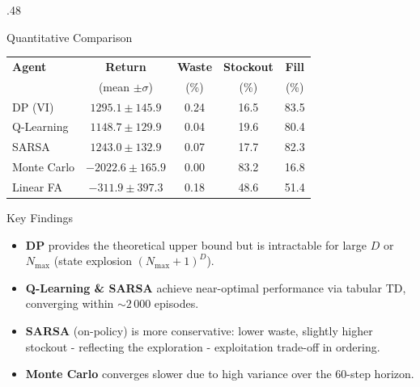 \documentclass[final]{beamer}
\begin{document}
\begin{frame}[t]{}
\begin{columns}[T]
\begin{column}{.48\textwidth}
\begin{exampleblock}{Quantitative Comparison}
\begin{center}
\small
\begin{tabular}{@{}lcccc@{}}
\toprule
\textbf{Agent} & \textbf{Return} & \textbf{Waste} & \textbf{Stockout} & \textbf{Fill} \\
               & (mean $\pm\sigma$) & (\%) & (\%) & (\%) \\
\midrule
DP (VI)        & $1295.1 \pm 145.9$   & 0.24  & 16.5  & 83.5  \\
Q-Learning     & $1148.7 \pm 129.9$   & 0.04  & 19.6  & 80.4  \\
SARSA          & $1243.0 \pm 132.9$   & 0.07  & 17.7  & 82.3  \\
Monte Carlo    & $-2022.6 \pm 165.9$  & 0.00  & 83.2  & 16.8  \\
Linear FA      & $-311.9 \pm 397.3$   & 0.18  & 48.6  & 51.4  \\
\bottomrule

\end{tabular}
\end{center}
\end{exampleblock}

\begin{alertblock}{Key Findings}
\begin{itemize}
  \item \textbf{DP} provides the theoretical upper bound but is intractable for large $D$ or $N_{\max}$ (state explosion $(N_{\max}\!+\!1)^D$).
  \item \textbf{Q-Learning \& SARSA} achieve near-optimal performance via tabular TD, converging within ${\sim}2\,000$ episodes.
  \item \textbf{SARSA} (on-policy) is more conservative: lower waste, slightly higher stockout - reflecting the exploration - exploitation trade-off in ordering.
  \item \textbf{Monte Carlo} converges slower due to high variance over the 60-step horizon.
\end{itemize}
\end{alertblock}


\end{column}
\end{columns}
\end{frame}
\end{document}
